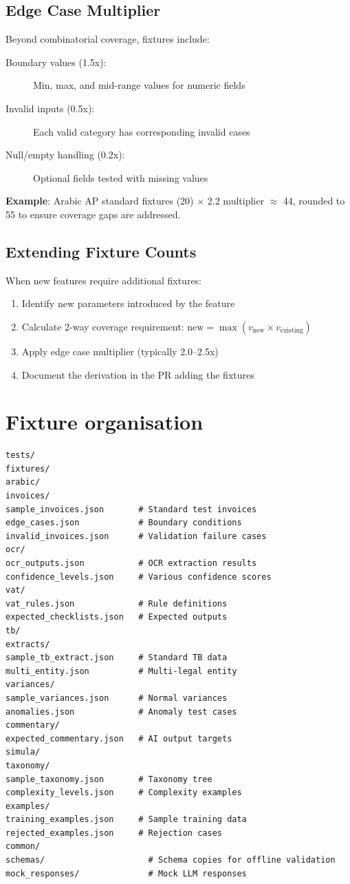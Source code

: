 \documentclass[12pt,a4paper,twoside]{report}
\begin{document}
\subsection{Edge Case Multiplier}

Beyond combinatorial coverage, fixtures include:
\begin{description}
\item[Boundary values (1.5x):] Min, max, and mid-range values for numeric fields
\item[Invalid inputs (0.5x):] Each valid category has corresponding invalid cases
\item[Null/empty handling (0.2x):] Optional fields tested with missing values
\end{description}

\noindent
\textbf{Example}: Arabic AP standard fixtures (20) $\times$ 2.2 multiplier $\approx$ 44,
rounded to 55 to ensure coverage gaps are addressed.

\subsection{Extending Fixture Counts}

When new features require additional fixtures:
\begin{enumerate}
\item Identify new parameters introduced by the feature
\item Calculate 2-way coverage requirement: $\text{new} = \max(v_{\text{new}} \times v_{\text{existing}})$
\item Apply edge case multiplier (typically 2.0--2.5x)
\item Document the derivation in the PR adding the fixtures
\end{enumerate}

\section{Fixture organisation}

\begin{lstlisting}[basicstyle=\ttfamily\small,caption={Test fixture directory structure.}]
tests/
fixtures/
arabic/
invoices/
sample_invoices.json       # Standard test invoices
edge_cases.json            # Boundary conditions
invalid_invoices.json      # Validation failure cases
ocr/
ocr_outputs.json           # OCR extraction results
confidence_levels.json     # Various confidence scores
vat/
vat_rules.json             # Rule definitions
expected_checklists.json   # Expected outputs
tb/
extracts/
sample_tb_extract.json     # Standard TB data
multi_entity.json          # Multi-legal entity
variances/
sample_variances.json      # Normal variances
anomalies.json             # Anomaly test cases
commentary/
expected_commentary.json   # AI output targets
simula/
taxonomy/
sample_taxonomy.json       # Taxonomy tree
complexity_levels.json     # Complexity examples
examples/
training_examples.json     # Sample training data
rejected_examples.json     # Rejection cases
common/
schemas/                     # Schema copies for offline validation
mock_responses/              # Mock LLM responses
\end{lstlisting}
\end{document}

